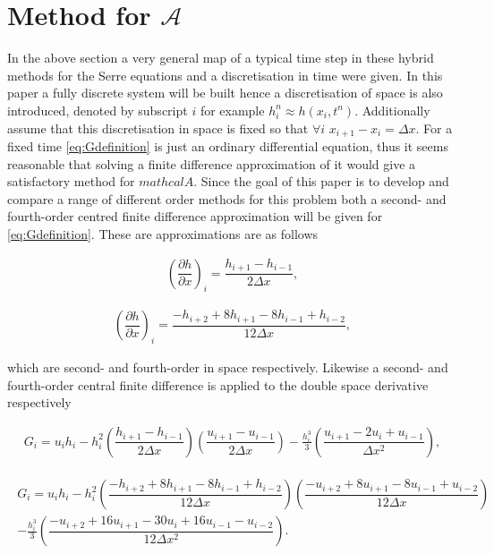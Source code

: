 \documentclass[SingleSpace,12pt]{Serre_ASCE}
\begin{document}
\section{Method for $\mathcal{A}$}
In the above section a very general map of a typical time step in these hybrid methods for the Serre equations and a discretisation in time were given. In this paper a fully discrete system will be built hence a discretisation of space is also introduced, denoted by subscript $i$ for example $h^n_i \approx h(x_i , t^n)$. Additionally assume that this discretisation in space is fixed so that $\forall i$ $x_{i+1} - x_{i} = \Delta x$. For a fixed time \eqref{eq:Gdefinition} is just an ordinary differential equation, thus it seems reasonable that solving a finite difference approximation of it would give a satisfactory method for $mathcal{A}$. Since the goal of this paper is to develop and compare a range of different order methods for this problem both a second- and fourth-order centred finite difference approximation will be given for \eqref{eq:Gdefinition}. These are approximations are as follows
\begin{linenomath*}
\begin{gather}\label{eq:exsecondcentdiff}
\left(\dfrac{\partial h}{\partial x}\right)_i = \dfrac{h_{i+1} - h_{i-1}}{2\Delta x}, 
\end{gather}
\end{linenomath*}
\begin{linenomath*}
\begin{gather}\label{eq:exfourthcentdiff}
\left(\dfrac{\partial h}{\partial x}\right)_i = \dfrac{-h_{i+2} + 8h_{i+1} - 8h_{i-1} + h_{i-2}}{12\Delta x}, 
\end{gather}
\end{linenomath*}
which are second- and fourth-order in space respectively. Likewise a second- and fourth-order central finite difference is applied to the double space derivative respectively 
\begin{linenomath*}
\begin{gather}\label{eq:Gsecondord}
G_i = u_ih_i - h_i^2 \left(\dfrac{h_{i+1} - h_{i-1}}{2\Delta x}\right) \left(\dfrac{u_{i+1} - u_{i-1}}{2\Delta x}\right) - \frac{h_i^3}{3} \left(\dfrac{u_{i+1} - 2 u_{i} + u_{i-1}}{\Delta x^2}\right),
\end{gather}
\end{linenomath*}
\begin{linenomath*}
\begin{gather}
\begin{split}
G_i = u_ih_i - h_i^2 \left(\dfrac{-h_{i+2} + 8h_{i+1} - 8h_{i-1} + h_{i-2}}{12\Delta x}\right) \left(\dfrac{-u_{i+2} + 8u_{i+1} - 8u_{i-1} + u_{i-2}}{12\Delta x}\right) \\ - \frac{h_i^3}{3} \left(\dfrac{-u_{i+2} + 16u_{i+1} - 30u_{i} + 16u_{i-1} - u_{i-2}}{12\Delta x^2}\right).
\end{split}
\end{gather}
\label{eq:Gfourthord}
\end{linenomath*}
\end{document}
